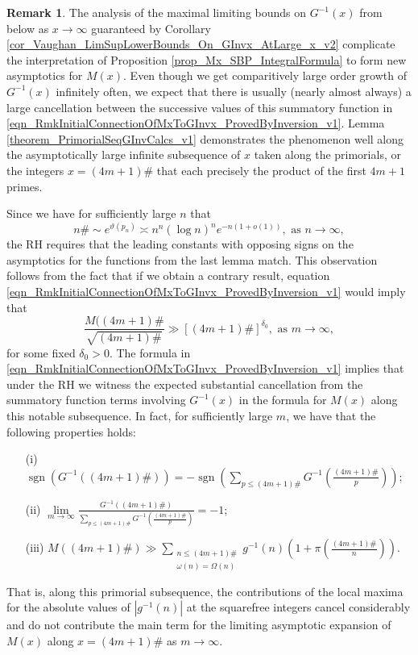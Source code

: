 \documentclass[11pt,reqno,a4letter]{article}
\numberwithin{figure}{section}
\numberwithin{table}{section}
\theoremstyle{plain}
\numberwithin{theorem}{section}
\theoremstyle{definition}
\newtheorem{remark}[theorem]{Remark}
\begin{document}
\begin{remark}
The analysis of the maximal limiting bounds on $G^{-1}(x)$ from below as 
$x \rightarrow \infty$ guaranteed by 
Corollary \ref{cor_Vaughan_LimSupLowerBounds_On_GInvx_AtLarge_x_v2} 
complicate the interpretation of 
Proposition \ref{prop_Mx_SBP_IntegralFormula} 
to form new asymptotics for $M(x)$. 
Even though we get comparitively large order growth of 
$G^{-1}(x)$ infinitely often, 
we expect that there is usually (nearly almost always) 
a large cancellation between the successive 
values of this summatory function in 
\eqref{eqn_RmkInitialConnectionOfMxToGInvx_ProvedByInversion_v1}. 
Lemma \ref{theorem_PrimorialSeqGInvCalcs_v1} 
demonstrates the phenomenon well along the asymptotically large infinite 
subsequence of $x$ taken along the primorials, or 
the integers $x = (4m+1)\#$ 
that each precisely the product of the first $4m+1$ primes. 

Since we have for sufficiently large $n$ that 
\cite{DUSART-1999,DUSART-2010} 
\[
n\# \sim e^{\vartheta(p_n)} \asymp n^n (\log n)^n e^{-n(1+o(1))}, 
     \text{ as } n \rightarrow \infty, 
\]
the RH requires that the leading constants with opposing signs 
on the asymptotics for the functions from the last lemma match. 
This observation follows from the fact that if we obtain a contrary result, 
equation \eqref{eqn_RmkInitialConnectionOfMxToGInvx_ProvedByInversion_v1} would imply that 
\[
\frac{M((4m+1)\#}{\sqrt{(4m+1)\#}} \gg \left[(4m+1)\#\right]^{\delta_0}, 
     \text{ as } m \rightarrow \infty, 
\]
for some fixed $\delta_0 > 0$. 
The formula in \eqref{eqn_RmkInitialConnectionOfMxToGInvx_ProvedByInversion_v1} 
implies that under the RH we witness the expected substantial cancellation from the 
summatory function terms involving $G^{-1}(x)$ in the formula for $M(x)$ 
along this notable subsequence. 
In fact, for sufficiently large $m$, we have that the following properties holds: 
\begin{itemize} 
\item[(i)] $\operatorname{sgn}\left(G^{-1}((4m+1)\#)\right) = - \operatorname{sgn}\left( 
     \sum\limits_{p \leq (4m+1)\#} G^{-1}\left(\frac{(4m+1)\#}{p}\right)\right)$; 
\item[(ii)] $\lim\limits_{m \rightarrow \infty} \frac{G^{-1}((4m+1)\#)}{ 
     \sum\limits_{p \leq (4m+1)\#} G^{-1}\left(\frac{(4m+1)\#}{p}\right)} = -1$; 
\item[(iii)] $M((4m+1)\#) \gg \sum\limits_{\substack{n \leq (4m+1)\# \\ \omega(n)=\Omega(n)}} 
     g^{-1}(n) \left(1+\pi\left(\frac{(4m+1)\#}{n}\right)\right)$. 
\end{itemize} 
That is, along this primorial subsequence, the contributions of the 
local maxima for the absolute values of 
$|g^{-1}(n)|$ at the squarefree integers cancel considerably and do not 
contribute the main term for the limiting asymptotic expansion of $M(x)$ along 
$x = (4m+1)\#$ as $m \rightarrow \infty$. 
\end{remark}
\end{document}
